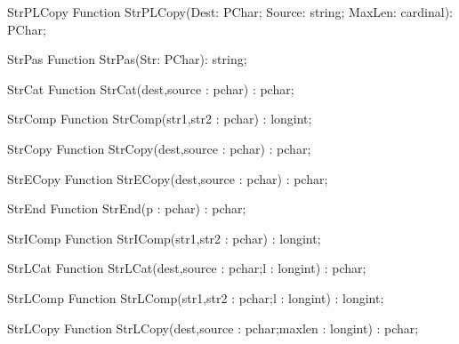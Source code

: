  
\begin{function}{StrPLCopy}
\Declaration
Function StrPLCopy(Dest: PChar; Source: string; MaxLen: cardinal): PChar;
\Description
\Errors
\SeeAlso
\end{function}

 
\begin{function}{StrPas}
\Declaration
Function StrPas(Str: PChar): string;
\Description
\Errors
\SeeAlso
\end{function}

 
\begin{function}{StrCat}
\Declaration
Function StrCat(dest,source : pchar) : pchar;
\Description
\Errors
\SeeAlso
\end{function}

 
\begin{function}{StrComp}
\Declaration
Function StrComp(str1,str2 : pchar) : longint;
\Description
\Errors
\SeeAlso
\end{function}

 
\begin{function}{StrCopy}
\Declaration
Function StrCopy(dest,source : pchar) : pchar;
\Description
\Errors
\SeeAlso
\end{function}

 
\begin{function}{StrECopy}
\Declaration
Function StrECopy(dest,source : pchar) : pchar;
\Description
\Errors
\SeeAlso
\end{function}

 
\begin{function}{StrEnd}
\Declaration
Function StrEnd(p : pchar) : pchar;
\Description
\Errors
\SeeAlso
\end{function}

 
\begin{function}{StrIComp}
\Declaration
Function StrIComp(str1,str2 : pchar) : longint;
\Description
\Errors
\SeeAlso
\end{function}

 
\begin{function}{StrLCat}
\Declaration
Function StrLCat(dest,source : pchar;l : longint) : pchar;
\Description
\Errors
\SeeAlso
\end{function}

 
\begin{function}{StrLComp}
\Declaration
Function StrLComp(str1,str2 : pchar;l : longint) : longint;
\Description
\Errors
\SeeAlso
\end{function}

 
\begin{function}{StrLCopy}
\Declaration
Function StrLCopy(dest,source : pchar;maxlen : longint) : pchar;
\Description
\Errors
\SeeAlso
\end{function}

